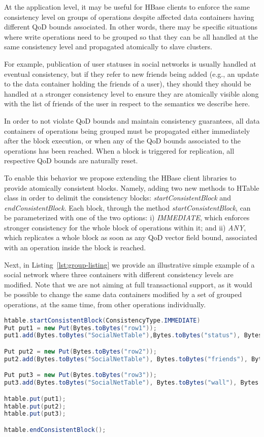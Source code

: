 At the application level, it may be useful for HBase clients to enforce the same consistency level on groups of operations despite affected data containers having different QoD bounds associated. In other words, there may be specific situations where write operations need to be grouped so that they can be all handled at the same consistency level and propagated atomically to slave clusters. 

For example, publication of user statuses in social networks is usually handled at eventual consistency, but if they refer to new friends being added (e.g., an update to the data container holding the friends of a user), they should they should be handled at a stronger consistency level to ensure they are atomically visible along with the list of friends of the user in respect to the semantics we describe here.

In order to not violate QoD bounds and maintain consistency guarantees, all data containers of operations being grouped must be propagated either immediately after the block execution, or when any of the QoD bounds associated to the operations has been reached. When a block is triggered for replication, all respective QoD bounds are naturally reset. 

To enable this behavior we propose extending the HBase client libraries to provide atomically consistent blocks.
Namely, adding two new methods to HTable class in order to delimit the consistency blocks: \textit{startConsistentBlock} and \textit{endConsistentBlock}. Each block, through the method \textit{startConsistentBlock}, can be parameterized with one of the two options: i) \textit{IMMEDIATE}, which enforces stronger consistency for the whole block of operations within it; and ii) \textit{ANY}, which replicates a whole block as soon as any QoD vector field bound, associated with an operation inside the block is reached.

Next, in Listing~\ref{lst:group-listing} we provide an illustrative simple example of a social network where three containers with different consistency levels are modified. Note that we are not aiming at full transactional support, as it would be possible to change the same data containers modified by a set of grouped operations, at the same time, from other operations individually.

\begin{lstlisting}[language={java}, caption={Operation grouping},label={lst:group-listing}]
htable.startConsistentBlock(ConsistencyType.IMMEDIATE)
Put put1 = new Put(Bytes.toBytes("row1"));
put1.add(Bytes.toBytes("SocialNetTable"),Bytes.toBytes("status"), Bytes.toBytes("friend 12345 added"));

Put put2 = new Put(Bytes.toBytes("row2"));
put2.add(Bytes.toBytes("SocialNetTable"), Bytes.toBytes("friends"), Bytes.toBytes("12345"));

Put put3 = new Put(Bytes.toBytes("row3"));
put3.add(Bytes.toBytes("SocialNetTable"), Bytes.toBytes("wall"), Bytes.toBytes("12345 is now a friend"));

htable.put(put1);
htable.put(put2);
htable.put(put3);

htable.endConsistentBlock();
\end{lstlisting}